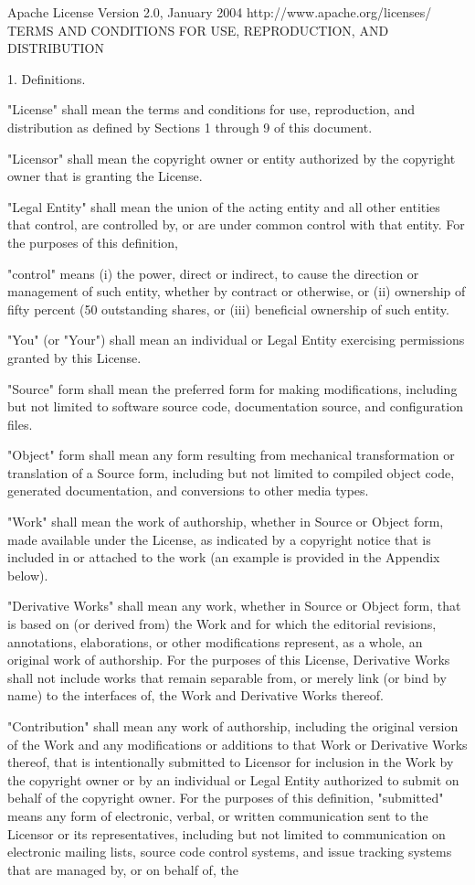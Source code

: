 \begin{DoxyVerb}Apache License
 Version 2.0, January 2004
 http://www.apache.org/licenses/
 TERMS AND CONDITIONS FOR USE, REPRODUCTION, AND DISTRIBUTION

 1. Definitions.

 "License" shall mean the terms and conditions for use, reproduction,
 and distribution as defined by Sections 1 through 9 of this document.

 "Licensor" shall mean the copyright owner or entity authorized by
 the copyright owner that is granting the License.

 "Legal Entity" shall mean the union of the acting entity and all
 other entities that control, are controlled by, or are under common
 control with that entity. For the purposes of this definition,

 "control" means (i) the power, direct or indirect, to cause the
 direction or management of such entity, whether by contract or
 otherwise, or (ii) ownership of fifty percent (50%
 outstanding shares, or (iii) beneficial ownership of such entity.

 "You" (or "Your") shall mean an individual or Legal Entity
 exercising permissions granted by this License.

 "Source" form shall mean the preferred form for making modifications,
 including but not limited to software source code, documentation
 source, and configuration files.

 "Object" form shall mean any form resulting from mechanical
 transformation or translation of a Source form, including but
 not limited to compiled object code, generated documentation,
 and conversions to other media types.

 "Work" shall mean the work of authorship, whether in Source or
 Object form, made available under the License, as indicated by a
 copyright notice that is included in or attached to the work
 (an example is provided in the Appendix below).

 "Derivative Works" shall mean any work, whether in Source or Object
 form, that is based on (or derived from) the Work and for which the
 editorial revisions, annotations, elaborations, or other modifications
 represent, as a whole, an original work of authorship. For the purposes
 of this License, Derivative Works shall not include works that remain
 separable from, or merely link (or bind by name) to the interfaces of,
 the Work and Derivative Works thereof.

 "Contribution" shall mean any work of authorship, including
 the original version of the Work and any modifications or additions
 to that Work or Derivative Works thereof, that is intentionally
 submitted to Licensor for inclusion in the Work by the copyright owner
 or by an individual or Legal Entity authorized to submit on behalf of
 the copyright owner. For the purposes of this definition, "submitted"
 means any form of electronic, verbal, or written communication sent
 to the Licensor or its representatives, including but not limited to
 communication on electronic mailing lists, source code control systems,
 and issue tracking systems that are managed by, or on behalf of, the


\end{DoxyVerb}
